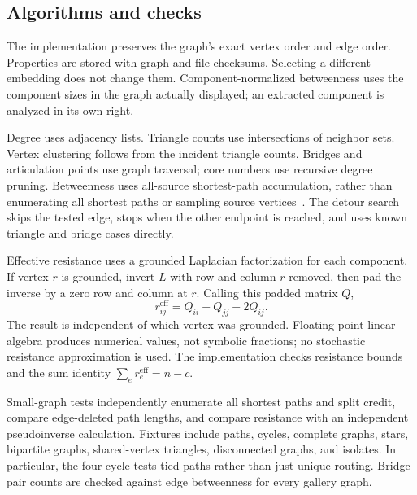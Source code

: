 \documentclass[11pt]{article}
\newcommand{\eff}{r^{\mathrm{eff}}}
\begin{document}
\subsection{Algorithms and checks}
The implementation preserves the graph's exact vertex order and edge order. Properties are stored with graph and file checksums. Selecting a different embedding does not change them. Component-normalized betweenness uses the component sizes in the graph actually displayed; an extracted component is analyzed in its own right.

Degree uses adjacency lists. Triangle counts use intersections of neighbor sets. Vertex clustering follows from the incident triangle counts. Bridges and articulation points use graph traversal; core numbers use recursive degree pruning. Betweenness uses all-source shortest-path accumulation, rather than enumerating all shortest paths or sampling source vertices~\cite{brandes}. The detour search skips the tested edge, stops when the other endpoint is reached, and uses known triangle and bridge cases directly.

Effective resistance uses a grounded Laplacian factorization for each component. If vertex $r$ is grounded, invert $L$ with row and column $r$ removed, then pad the inverse by a zero row and column at $r$. Calling this padded matrix $Q$,
\begin{equation}
 \eff_{ij}=Q_{ii}+Q_{jj}-2Q_{ij}.
\end{equation}
The result is independent of which vertex was grounded. Floating-point linear algebra produces numerical values, not symbolic fractions; no stochastic resistance approximation is used. The implementation checks resistance bounds and the sum identity $\sum_e\eff_e=n-c$.

Small-graph tests independently enumerate all shortest paths and split credit, compare edge-deleted path lengths, and compare resistance with an independent pseudoinverse calculation. Fixtures include paths, cycles, complete graphs, stars, bipartite graphs, shared-vertex triangles, disconnected graphs, and isolates. In particular, the four-cycle tests tied paths rather than just unique routing. Bridge pair counts are checked against edge betweenness for every gallery graph.
\end{document}
